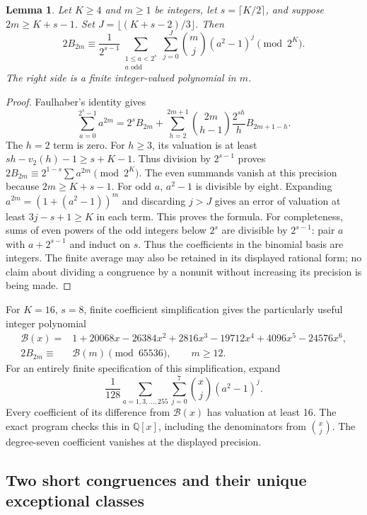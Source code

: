 \documentclass[11pt,a4paper]{article}
\numberwithin{equation}{section}
\newtheorem{lemma}[theorem]{Lemma}
\theoremstyle{definition}
\theoremstyle{remark}
\begin{document}
\begin{lemma}\label{rt:general-B}
Let $K\ge4$ and $m\ge1$ be integers, let $s=\lceil K/2\rceil$, and suppose
$2m\ge K+s-1$. Set $J=\lfloor(K+s-2)/3\rfloor$. Then
\[
 2B_{2m}\equiv \frac1{2^{s-1}}
 \sum_{\substack{1\le a<2^s\\a\text{ odd}}}
 \sum_{j=0}^{J}\binom mj(a^2-1)^j\pmod{2^K}.
\]
The right side is a finite integer-valued polynomial in $m$.
\end{lemma}
\begin{proof}
Faulhaber's identity gives
\[
 \sum_{a=0}^{2^s-1}a^{2m}
 =2^sB_{2m}+
 \sum_{h=2}^{2m+1}\binom{2m}{h-1}\frac{2^{sh}}h
                         B_{2m+1-h}.
\]
The $h=2$ term is zero. For $h\ge3$, its valuation is at least
$sh-v_2(h)-1\ge s+K-1$. Thus division by $2^{s-1}$ proves
$2B_{2m}\equiv2^{1-s}\sum a^{2m}\pmod{2^K}$. The even summands
vanish at this precision because $2m\ge K+s-1$.
For odd $a$, $a^2-1$ is divisible by eight. Expanding
$a^{2m}=(1+(a^2-1))^m$ and discarding $j>J$ gives an error of
valuation at least $3j-s+1\ge K$ in each term. This proves the
formula. For completeness, sums of even powers of the odd integers below $2^s$ are divisible by $2^{s-1}$: pair $a$ with $a+2^{s-1}$ and induct on $s$. Thus the coefficients in the binomial basis are integers. The finite average may also be retained in its displayed
rational form; no claim about dividing a congruence by a nonunit
without increasing its precision is being made.
\end{proof}

For $K=16$, $s=8$, finite coefficient simplification gives the
particularly useful integer polynomial
\begin{equation}\label{rt:B16}
 \begin{split}
 \mathcal B(x)={}&1+20068x-26384x^2+2816x^3-19712x^4
                  +4096x^5-24576x^6,\\
 2B_{2m}\equiv{}&\mathcal B(m)\pmod{65536},\qquad m\ge12.
 \end{split}
\end{equation}
For an entirely finite specification of this simplification, expand
\[
 \frac1{128}\sum_{a=1,3,\ldots,255}
       \sum_{j=0}^{7}\binom{x}{j}(a^2-1)^j.
\]
Every coefficient of its difference from $\mathcal B(x)$ has
valuation at least 16. The exact program checks this in
$\mathbb Q[x]$, including the denominators from $\binom{x}{j}$.
The degree-seven coefficient vanishes at the displayed precision.

\subsection{Two short congruences and their unique exceptional classes}
\end{document}
